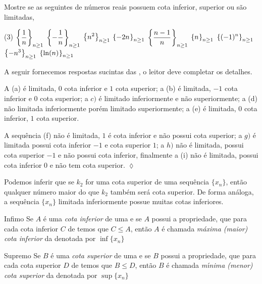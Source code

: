 \begin{exer}
Mostre se as seguintes \seqs  de n\'{u}meros reais possuem cota inferior, superior ou s\~{a}o limitadas,
\begin{tasks}[label=\rm{(\alph*)},item-indent=3em,label-width=4ex,ref=(\alph*)](3)
 \task  \(\displaystyle{\left\{\dfrac{1}{n}_{}\right\}_{n\geq 1}}\)
 \task   \(\displaystyle{\left\{-\dfrac{1}{n}_{}\right\}_{n\geq 1}}\)
 \task   \(\displaystyle{\left\{n^2_{}\right\}_{n\geq 1}}\)
 \task   \(\displaystyle{\left\{-2n_{}\right\}_{n\geq 1}}\)
 \task   \(\displaystyle{\left\{\dfrac{n-1}{n}_{}\right\}_{n\geq 1}}\)
 \task  \(\displaystyle{\left\{n_{}\right\}_{n\geq 1}}\)
 \task  \(\displaystyle{\left\{(-1)^n_{}\right\}_{n\geq 1}}\)
 \task  \(\displaystyle{\left\{-n^3_{}\right\}_{n\geq 1}}\)
 \task   \(\displaystyle{\left\{\ln(n)_{}\right\}_{n\geq 1}}\)
\end{tasks}
\end{exer}

\solo A seguir fornecemos respostas sucintas das \seqs, o leitor deve completar os detalhes.

A \seq (a) \'{e} limitada, $0$ cota inferior e $1$ cota superior; a \seq (b) \'{e} limitada, $-1$ cota inferior e $0$ cota superior; a \seq $c)$ \'{e} limitado inferiormente e n\~{a}o superiormente; a \seq (d) n\~{a}o limitada inferiormente por\'{e}m limitado superiormente; a \seq (e) \'{e} limitada, $0$ cota inferior, $1$ cota superior.

A sequ\^{e}ncia (f) n\~{a}o \'{e} limitada, $1$ \'{e} cota inferior e n\~{a}o possui cota superior; a \seq $g)$ \'{e} limitada possui cota inferior $-1$ e cota superior $1$; a \seq $h)$ n\~{a}o \'{e} limitada, possui cota superior $-1$ e n\~{a}o possui cota inferior, finalmente a \seq (i) n\~{a}o \'{e} limitada, possui cota inferior $0$ e n\~{a}o tem cota superior. \hfill \(\lozenge\)


\begin{note}
Podemos inferir que se $k_{2}$ for uma cota superior de uma sequ\^{e}ncia $\{x_n\}$, ent\~{a}o qualquer n\'{u}mero maior do que $k_2$ tamb\'{e}m ser\'{a} cota
superior. De forma an\'{a}loga, a sequ\^{e}ncia $\{x_n\}$ limitada inferiormente possue muitas cotas inferiores.
\end{note}

\begin{defic}{Infimo}
Se $A$ \'{e} uma \textit{cota inferior} de uma \seq {} e se $A$ possui a propriedade, que para cada cota inferior $C$ de  temos que $C\leq A$, ent\~{a}o $A$ \'{e} chamada \textit{m\'{a}xima (maior) cota inferior} da \seq denotada por $\inf\{x_n\}$
\end{defic}

\begin{defic}{Supremo}
Se $B$ \'{e} uma \textit{cota superior} de uma \seq {} e se $B$ possui a propriedade, que para cada cota superior $D$ de
 temos que $B\leq D$, ent\~{a}o $B$ \'{e} chamada \textit{m\'{\i}nima (menor) cota superior} da \seq denotada por $\sup\{x_n\}$
\end{defic}

